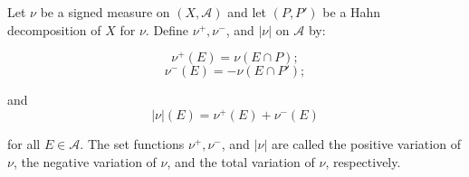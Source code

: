 Let $\nu$ be a signed measure on $(X, \mathcal{A})$ and let $(P, P')$ be a Hahn decomposition of $X$ for $\nu$. Define $\nu^+, \nu^-$, and $|\nu|$ on $\mathcal{A}$ by:

$$\nu^+(E) = \nu(E \cap P);$$
$$\nu^-(E) = -\nu(E \cap P');$$

and
$$|\nu|(E) = \nu^+(E) + \nu^-(E)$$

for all $E \in \mathcal{A}$. The set functions $\nu^+, \nu^-$, and $|\nu|$ are called the positive variation of $\nu$, the negative variation of $\nu$, and the total variation of $\nu$, respectively.